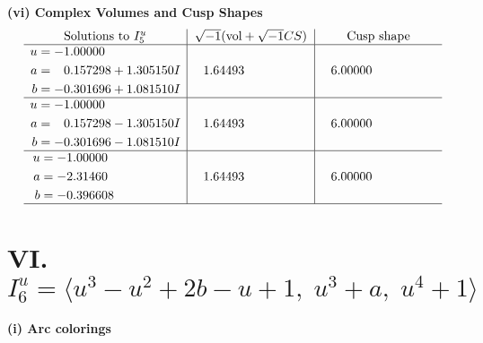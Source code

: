 \documentclass[1p]{elsarticle_modified}
\theoremstyle{definition}
\newcommand{\I}{\sqrt{-1}}
\begin{document}
\newpage\flushleft \textbf{(vi) Complex Volumes and Cusp Shapes}
$$\begin{array}{c|c|c}  
\text{Solutions to }I^u_{5}& \I (\text{vol} + \sqrt{-1}CS) & \text{Cusp shape}\\
 \hline 
\begin{aligned}
u &= -1.00000\phantom{ +0.000000I} \\
a &= \phantom{-}0.157298 + 1.305150 I \\
b &= -0.301696 + 1.081510 I\end{aligned}
 & \phantom{-}1.64493\phantom{ +0.000000I} & \phantom{-}6.00000\phantom{ +0.000000I} \\ \hline\begin{aligned}
u &= -1.00000\phantom{ +0.000000I} \\
a &= \phantom{-}0.157298 - 1.305150 I \\
b &= -0.301696 - 1.081510 I\end{aligned}
 & \phantom{-}1.64493\phantom{ +0.000000I} & \phantom{-}6.00000\phantom{ +0.000000I} \\ \hline\begin{aligned}
u &= -1.00000\phantom{ +0.000000I} \\
a &= -2.31460\phantom{ +0.000000I} \\
b &= -0.396608\phantom{ +0.000000I}\end{aligned}
 & \phantom{-}1.64493\phantom{ +0.000000I} & \phantom{-}6.00000\phantom{ +0.000000I}\\
 \hline 
 \end{array}$$\newpage\newpage\renewcommand{\arraystretch}{1}
\centering \section*{VI. $I^u_{6}= \langle u^3- u^2+2 b- u+1,\;u^3+a,\;u^4+1 \rangle$}
\flushleft \textbf{(i) Arc colorings}\\
\end{document}
